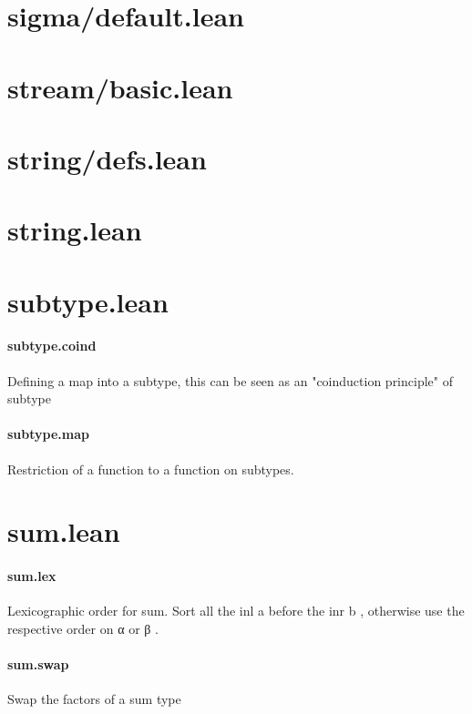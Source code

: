 \documentclass{article}
\begin{document}
\section{sigma/default.lean}\section{stream/basic.lean}\section{string/defs.lean}\section{string.lean}\section{subtype.lean}\paragraph{subtype.coind}
\par
Defining a map into a subtype, this can be seen as an "coinduction principle" of 
\colorbox[RGB]{253,246,227}{{{{\color[RGB]{101, 123, 131} subtype }}}}\paragraph{subtype.map}
\par
Restriction of a function to a function on subtypes.
\section{sum.lean}\paragraph{sum.lex}
\par
Lexicographic order for sum. Sort all the 
\colorbox[RGB]{253,246,227}{{{{\color[RGB]{101, 123, 131} inl a }}}} before the 
\colorbox[RGB]{253,246,227}{{{{\color[RGB]{101, 123, 131} inr b }}}},
otherwise use the respective order on 
\colorbox[RGB]{253,246,227}{{{{\color[RGB]{101, 123, 131} α }}}} or 
\colorbox[RGB]{253,246,227}{{{{\color[RGB]{101, 123, 131} β }}}}.
\paragraph{sum.swap}
\par
Swap the factors of a sum type
\end{document}
